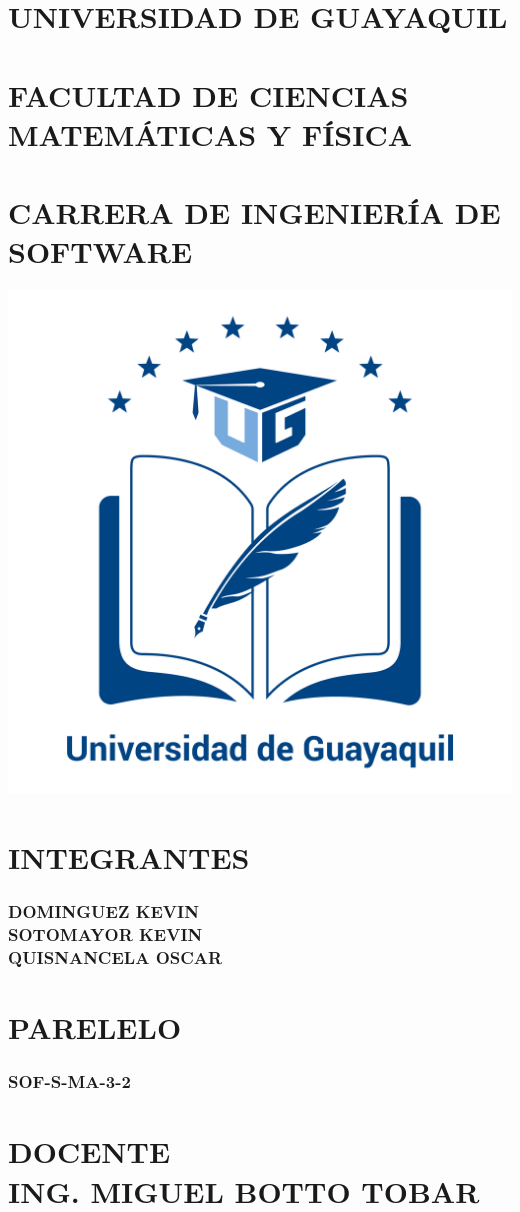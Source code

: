 \documentclass[12pt,a4paper]{article}
\author{Grupo }
\begin{document}
\begin{center}
\section*{UNIVERSIDAD DE GUAYAQUIL}
\section*{FACULTAD DE CIENCIAS MATEMÁTICAS Y FÍSICA}
\section*{CARRERA DE INGENIERÍA DE SOFTWARE}
\includegraphics[scale=0.3]{UGlogo.png}  
\section*{INTEGRANTES}
\subsubsection*{DOMINGUEZ KEVIN\\SOTOMAYOR KEVIN\\QUISNANCELA OSCAR}
\section*{PARELELO}
\subsubsection*{SOF-S-MA-3-2}
\section*{DOCENTE\\ING. MIGUEL BOTTO TOBAR}
\end{center}
\newpage
\end{document}
